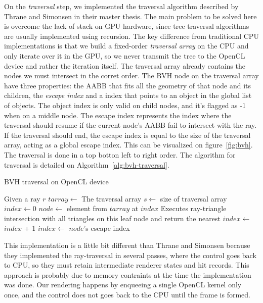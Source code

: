 \documentclass{vgtc}
\begin{document}
On the \emph{traversal} step, we implemented the traversal algorithm
described by Thrane and Simonsen in their master thesis. The main
problem to be solved here is overcome the lack of stack on GPU
hardware, since tree traversal algorithms are usually implemented
using recursion. The key difference from traditional CPU
implementations is that we build a fixed-order \emph{traversal array}
on the CPU and only iterate over it in the GPU, so we never transmit
the tree to the OpenCL device and rather the iteration itself. The
traversal array already contains the nodes we must intersect in the
corret order. The BVH node on the traversal array have three
properties: the AABB that fits all the geometry of that node and its
children, the \emph{escape index} and a index that points to an object
in the global list of objects. The object index is only valid on child
nodes, and it's flagged as -1 when on a middle node. The escape index
represents the index where the traversal should resume if the current
node's AABB fail to intersect with the ray. If the traversal should
end, the escape index is equal to the size of the traversal array,
acting as a global escape index. This can be visualized on
figure~\ref{fig:bvh}. The traversal is done in a top botton left to
right order. The algorithm for traversal is detailed on
Algorithm~\ref{alg:bvh-traversal}.


\begin{algorithm}
\caption{BVH traversal on OpenCL device}
\label{alg:bvh-traversal}
\begin{algorithmic}[1]
\State Given a ray $r$
\State $tarray\gets$ The traversal array
\State $s\gets$ size of traversal array
\State $index\gets 0$
\State $node\gets$ element from $tarray$ at $index$
\State Executes ray-triangle intersection with all triangles on this leaf node and return the nearest
\Else
\State $index\gets$ $index$ + 1
\EndIf
\Else
\State $index\gets$ $node$'s escape index
\EndIf
\EndWhile
\end{algorithmic}
\end{algorithm}

This implementation is a little bit different than Thrane and Simonsen
because they implemented the ray-traversal in several passes, where
the control goes back to CPU, so they must retain intermediate
renderer states and hit records. This approach is probably due to
memory contraints at the time the implementation was done. Our
rendering happens by enqueeing a single OpenCL kernel only once, and
the control does not goes back to the CPU until the frame is formed.
\end{document}
